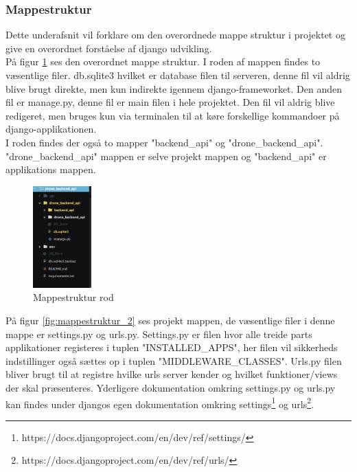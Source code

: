 \subsubsection*{Mappestruktur}
Dette underafsnit vil forklare om den overordnede mappe struktur i projektet og give en overordnet forståelse af django udvikling. \\

På figur \ref{fig:mappestruktur_1} ses den overordnet mappe struktur. I roden af mappen findes to væsentlige filer. db.sqlite3 hvilket er database filen til serveren, denne fil vil aldrig blive brugt direkte, men kun indirekte igennem django-frameworket. Den anden fil er manage.py, denne fil er main filen i hele projektet. Den fil vil aldrig blive redigeret, men bruges kun via terminalen til at køre forskellige kommandoer på django-applikationen. \\

I roden findes der også to mapper "backend\_api" og "drone\_backend\_api". "drone\_backend\_api"  mappen er selve projekt mappen og "backend\_api" er applikations mappen.

\begin{figure}[H]
	\centering
	\includegraphics[width=0.2\textwidth]{Billeder/implementation/mappestruktur_1.png}
	\caption{Mappestruktur rod}
	\label{fig:mappestruktur_1}
\end{figure}

På figur \ref{fig:mappestruktur_2} ses projekt mappen, de væsentlige filer i denne mappe er settings.py og urls.py. Settings.py er filen hvor alle treide parts applikationer registeres i tuplen "INSTALLED\_APPS", her filen vil sikkerheds indstillinger også sættes op i tuplen "MIDDLEWARE\_CLASSES". Urls.py filen bliver brugt til at registre hvilke urls server kender og hvilket funktioner/views der skal præsenteres. Yderligere dokumentation omkring settings.py og urls.py kan findes under djangos egen dokumentation omkring settings\footnote{https://docs.djangoproject.com/en/dev/ref/settings/} og urls\footnote{https://docs.djangoproject.com/en/dev/ref/urls/}.

